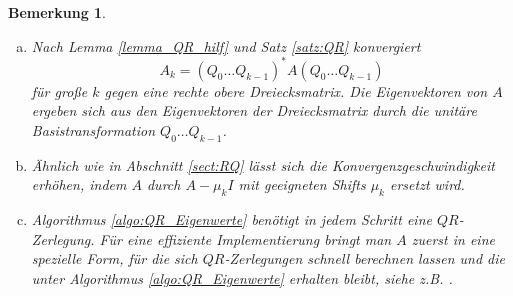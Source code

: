 \documentclass[12pt,a4paper]{book}
\theoremstyle{break}
\newtheorem{bemerkung}[theorem]{Bemerkung}
\theoremstyle{nonumberplain}
\newcommand{\1}{\mathbbm{1}} 			      	%
\begin{document}
\begin{bemerkung}
\begin{enumerate}[(a)]
\item Nach Lemma \ref{lemma_QR_hilf} und Satz \ref{satz:QR} konvergiert
\[
A_{k}=(Q_0 \ldots Q_{k-1})^* A (Q_0 \ldots Q_{k-1})
\]
für große $k$ gegen eine rechte obere Dreiecksmatrix. Die Eigenvektoren von $A$ ergeben
sich aus den Eigenvektoren der Dreiecksmatrix durch die unitäre Basistransformation $Q_0 \ldots Q_{k-1}$.
\item Ähnlich wie in Abschnitt \ref{sect:RQ} lässt sich die Konvergenzgeschwindigkeit erhöhen,
indem $A$ durch $A-\mu_k I$ mit geeigneten \emph{Shifts} $\mu_k$ ersetzt wird.
%
\item Algorithmus \ref{algo:QR_Eigenwerte} benötigt in jedem Schritt eine $QR$-Zerlegung. Für eine 
effiziente Implementierung bringt man $A$ zuerst in eine spezielle Form, für die sich $QR$-Zerlegungen schnell berechnen lassen
und die unter Algorithmus \ref{algo:QR_Eigenwerte} erhalten bleibt, siehe z.B. \cite{Hanke}.
\end{enumerate}
\end{bemerkung}
\end{document}
